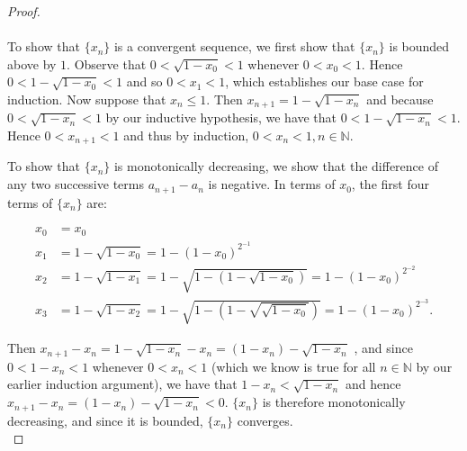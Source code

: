    \begin{proof}\ \\\\

        To show that $\{x_n\}$ is a convergent sequence, we first show that
        $\{x_n\}$ is bounded above by $1$. Observe that $0 < \sqrt{1 - x_0} < 1$
        whenever $0 < x_0 < 1$. Hence $0 < 1 - \sqrt{1 - x_0} < 1$ and so 
        $0 < x_1 < 1$, which establishes our base case for induction. Now
        suppose that $x_n \le 1$. Then $x_{n+1} = 1 - \sqrt{1 - x_n}$ and
        because $0 < \sqrt{1 - x_n} < 1$ by our inductive hypothesis, we have
        that $0 < 1 - \sqrt{1 - x_n} < 1$. Hence 
        $0 < x_{n+1} < 1$ and thus by induction,
         $0 < x_n < 1, n \in \mathbb{N}$.

        To show that $\{x_n\}$ is monotonically decreasing, we show that the
        difference of any two successive terms $a_{n+1} - a_n$ is negative.
        In terms of $x_0$, the first four terms of $\{x_n\}$ are:

        \begin{align*}
            x_0 &= x_0 \\
            x_1 &= 1 - \sqrt{1 - x_0}
                 = 1 - \left(1 - x_0\right)^{2^{-1}} \\
            x_2 &= 1 - \sqrt{1 - x_1}
                 = 1 - \sqrt{1 - \left(1 - \sqrt{1 - x_0}\right)}
                 = 1 - \left(1 - x_0\right)^{2^{-2}} \\ 
            x_3 &= 1 - \sqrt{1 - x_2}
                 = 1 - \sqrt{1 - \left(1 - \sqrt{\sqrt{1 - x_0}}\right)}
                 = 1 - \left(1 - x_0\right)^{2^{-3}}.
        \end{align*}

        Then $x_{n+1} - x_n = 1 - \sqrt{1 - x_n} - x_n = (1 - x_n) - \sqrt{1 - x_n}$
        , and since $0 < 1 - x_n < 1$ whenever $0 < x_n < 1$ (which we know
        is true for all $n \in \mathbb{N}$ by our earlier induction argument),
        we have that $1 - x_n < \sqrt{1 - x_n}$ and hence
        $x_{n+1} - x_n = \left(1 - x_n\right) - \sqrt{1 - x_n} < 0$.
        $\{x_n\}$ is therefore monotonically decreasing, and since it is
        bounded, $\{x_n\}$ converges.
        \\
    \end{proof}